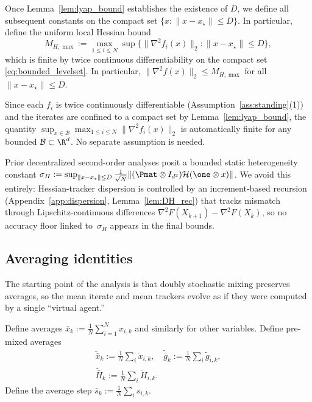\documentclass[review,onefignum,onetabnum]{siamart171218}
\begin{document}
	Once Lemma~\ref{lem:lyap_bound} establishes the existence of $D$,
	we define all subsequent constants on the compact set $\{x:\|x-x_\star\|\le D\}$.
	In particular, define the uniform local Hessian bound
	\begin{equation}\label{eq:MHmax_def}
		M_{H,\max}\!:=\!\max_{1\le i\le N}\sup\{\|\nabla^2 f_i(x)\|_2:\|x\!-\!x_\star\|\!\le\! D\},
	\end{equation}
	which is finite by twice continuous differentiability on the compact set \eqref{eq:bounded_levelset}.
	In particular, $\|\nabla^2 f(x)\|_2\le M_{H,\max}$ for all $\|x-x_\star\|\le D$.
	
	\begin{remark}
		Since each $f_i$ is twice continuously differentiable (Assumption~\ref{ass:standing}(1))
		and the iterates are confined to a compact set by Lemma~\ref{lem:lyap_bound},
		the quantity $\sup_{x\in\mathcal B}\max_{1\le i\le N}\|\nabla^2 f_i(x)\|_2$
		is automatically finite for any bounded $\mathcal B\subset\R^d$.
		No separate assumption is needed.
	\end{remark}
	
	\begin{remark}
		Prior decentralized second-order analyses
		\citep{mokhtari2016esom,sun2022sonata,maritan2023networkgiant} posit a bounded
		static heterogeneity constant
		$\sigma_H:=\sup_{\|x-x_\star\|\le D}
		\frac{1}{\sqrt N}\|(\Pmat\otimes I_{d^2})\mathcal H(\one\otimes x)\|$.
		We avoid this entirely: Hessian-tracker dispersion is controlled
		by an increment-based recursion
		(Appendix~\ref{app:dispersion}, Lemma~\ref{lem:DH_rec})
		that tracks mismatch through Lipschitz-continuous
		differences $\nabla^2 F(X_{k+1})-\nabla^2 F(X_k)$,
		so no accuracy floor linked to~$\sigma_H$ appears in the
		final bounds.
	\end{remark}
	
	\subsection{Averaging identities}\label{ssec:avg}
	The starting point of the analysis is that doubly stochastic mixing
	preserves averages, so the mean iterate and mean trackers evolve as if
	they were computed by a single ``virtual agent.''
	
	Define averages $\bar x_k:=\frac1N\sum_{i=1}^N x_{i,k}$ and similarly for other variables.
	Define pre-mixed averages
	\begin{gather*}
		\tilde{\bar x}_k:=\tfrac1N\!\sum_i \tilde x_{i,k},\quad
		\tilde{\bar g}_k:=\tfrac1N\!\sum_i \tilde g_{i,k},\\
		\tilde{\bar H}_k:=\tfrac1N\!\sum_i \tilde H_{i,k}.
	\end{gather*}
	Define the average step $\bar s_k:=\frac1N\sum_i s_{i,k}$.
	
\end{document}
